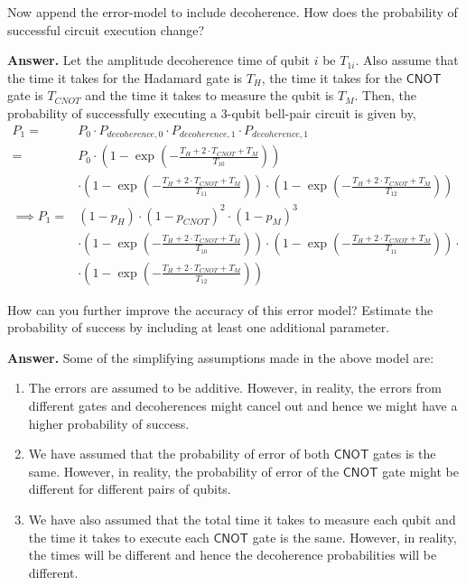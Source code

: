 \begin{question}
    Now append the error-model to include decoherence. How does the probability of successful circuit execution change?
\end{question}
\textbf{Answer.} Let the amplitude decoherence time of qubit $i$ be $T_{1i}$. Also assume that the time it takes for the Hadamard gate is $T_H$, the time it takes for the $\mathsf{CNOT}$ gate is $T_{CNOT}$ and the time it takes to measure the qubit is $T_M$. Then, the probability of successfully executing a $3$-qubit bell-pair circuit is given by,
\begin{equation}
    \begin{split}
        P_1 = &P_0\cdot P_{decoherence,0}\cdot P_{decoherence,1}\cdot P_{decoherence,1}\\
        = &P_0\cdot \left(1 - \exp\left(-\frac{T_H + 2\cdot T_{CNOT} + T_M}{T_{10}}\right)\right)\\
        & \cdot \left(1 - \exp\left(-\frac{T_H + 2\cdot T_{CNOT} + T_M}{T_{11}}\right)\right)\cdot \left(1 - \exp\left(-\frac{T_H + 2\cdot T_{CNOT} + T_M}{T_{12}}\right)\right)\\
        \implies P_1 = & (1-p_H)\cdot(1-p_{CNOT})^2\cdot(1-p_M)^3\\
        & \cdot \left(1 - \exp\left(-\frac{T_H + 2\cdot T_{CNOT} + T_M}{T_{10}}\right)\right)\cdot \left(1 - \exp\left(-\frac{T_H + 2\cdot T_{CNOT} + T_M}{T_{11}}\right)\right)\cdot\\
        & \cdot \left(1 - \exp\left(-\frac{T_H + 2\cdot T_{CNOT} + T_M}{T_{12}}\right)\right)
    \end{split}
\end{equation}

\tcbline{}

\begin{question}
    How can you further improve the accuracy of this error model? Estimate the probability of success by including at least one additional parameter.
\end{question}
\textbf{Answer.} Some of the simplifying assumptions made in the above model are:
\begin{enumerate}
    \item The errors are assumed to be additive. However, in reality, the errors from different gates and decoherences might cancel out and hence we might have a higher probability of success.
    \item \label{item:removed_assumption} We have assumed that the probability of error of both $\mathsf{CNOT}$ gates is the same. However, in reality, the probability of error of the $\mathsf{CNOT}$ gate might be different for different pairs of qubits.
    \item We have also assumed that the total time it takes to measure each qubit and the time it takes to execute each $\mathsf{CNOT}$ gate is the same. However, in reality, the times will be different and hence the decoherence probabilities will be different.
\end{enumerate}

